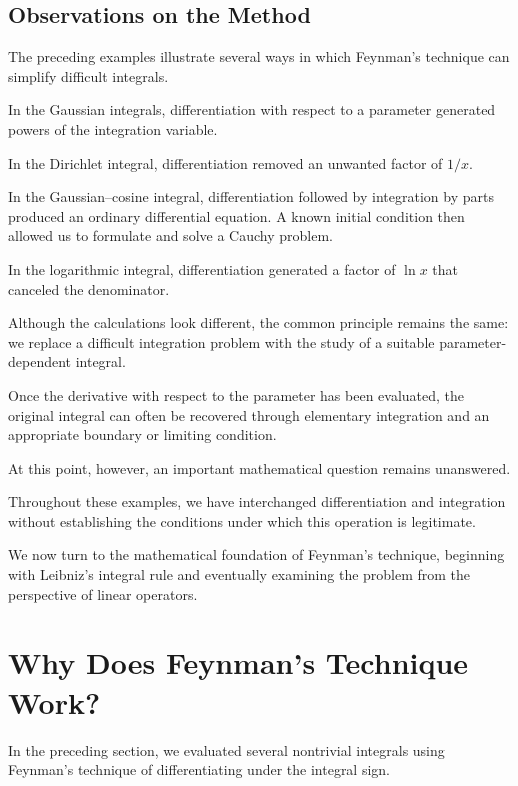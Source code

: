 \documentclass[11pt,a4paper]{article}
\theoremstyle{definition}
\theoremstyle{remark}
\begin{document}
\subsection{Observations on the Method}

The preceding examples illustrate
several ways in which Feynman's
technique can simplify difficult
integrals.

In the Gaussian integrals,
differentiation with respect to
a parameter generated powers
of the integration variable.

In the Dirichlet integral,
differentiation removed an
unwanted factor of $1/x$.

In the Gaussian--cosine integral,
differentiation followed by integration
by parts produced an ordinary differential
equation. A known initial condition
then allowed us to formulate and solve
a Cauchy problem.

In the logarithmic integral,
differentiation generated
a factor of $\ln x$ that
canceled the denominator.

Although the calculations
look different, the common
principle remains the same:
we replace a difficult
integration problem with
the study of a suitable
parameter-dependent integral.

Once the derivative with
respect to the parameter
has been evaluated, the
original integral can often
be recovered through
elementary integration
and an appropriate
boundary or limiting condition.

At this point, however,
an important mathematical
question remains unanswered.

Throughout these examples,
we have interchanged
differentiation and integration
without establishing the
conditions under which this
operation is legitimate.

We now turn to the mathematical
foundation of Feynman's technique,
beginning with Leibniz's
integral rule and eventually
examining the problem from
the perspective of linear
operators.

\section{Why Does Feynman's Technique Work?}

In the preceding section, we evaluated
several nontrivial integrals using
Feynman's technique of differentiating
under the integral sign.
\end{document}
